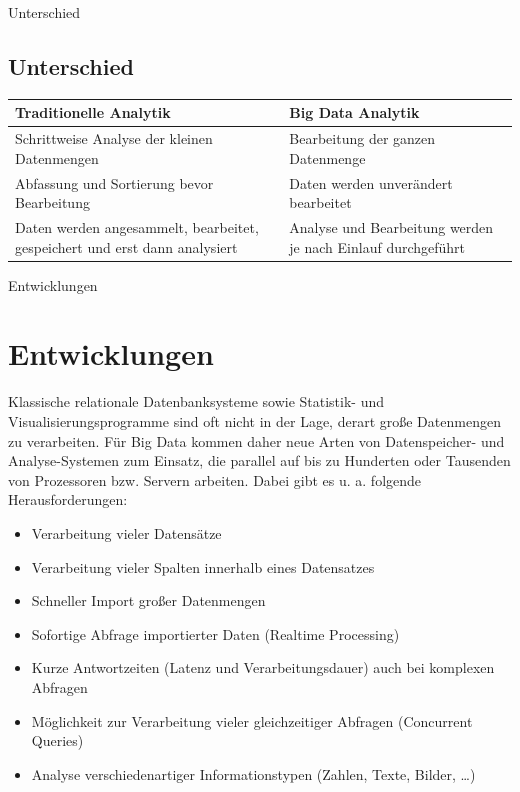 \documentclass[11pt]{beamer}
\begin{document}
\begin{frame}{Unterschied}
\subsection{Unterschied}
\begin{table}
\begin{tabular}{|l|l|}

Traditionelle Analytik & Big Data Analytik \\ \hline
Schrittweise Analyse der kleinen Datenmengen & Bearbeitung der ganzen Datenmenge \\ \hline
Abfassung und Sortierung bevor Bearbeitung & Daten werden unverändert bearbeitet \\ \hline
Daten werden angesammelt, bearbeitet, gespeichert und erst dann analysiert & Analyse und Bearbeitung werden je nach Einlauf durchgeführt 
\end{tabular}
\end{table}
\end{frame}


\begin{frame}  {Entwicklungen}
\section{Entwicklungen}
Klassische relationale Datenbanksysteme sowie Statistik- und Visualisierungsprogramme sind oft nicht in der Lage, derart große Datenmengen zu verarbeiten. Für Big Data kommen daher neue Arten von Datenspeicher- und Analyse-Systemen zum Einsatz, die parallel auf bis zu Hunderten oder Tausenden von Prozessoren bzw. Servern arbeiten. Dabei gibt es u. a. folgende Herausforderungen:
\end{frame}
\begin{frame}
\begin{itemize}
\item Verarbeitung vieler Datensätze
\item Verarbeitung vieler Spalten innerhalb eines Datensatzes
\item Schneller Import großer Datenmengen
\item Sofortige Abfrage importierter Daten (Realtime Processing)
\item Kurze Antwortzeiten (Latenz und Verarbeitungsdauer) auch bei komplexen Abfragen
\item Möglichkeit zur Verarbeitung vieler gleichzeitiger Abfragen (Concurrent Queries)
\item Analyse verschiedenartiger Informationstypen (Zahlen, Texte, Bilder, …)

\end{itemize}

\end{frame}
\end{document}
